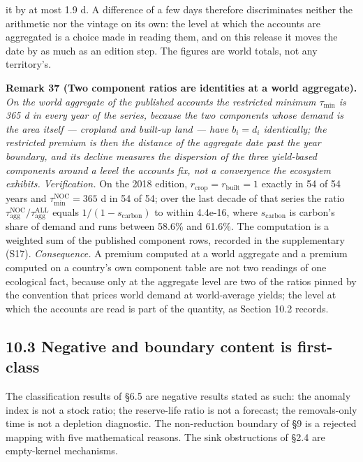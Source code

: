 \documentclass[11pt]{article}
\begin{document}
it by at most 1.9 d. A difference of a few days therefore discriminates neither the arithmetic nor the vintage on its own: the level at which the accounts are aggregated is a choice made in reading them, and on this release it moves the date by as much as an edition step. The figures are world totals, not any territory's.

\textbf{Remark 37 (Two component ratios are identities at a world aggregate).} \emph{On the world aggregate of the published accounts the restricted minimum \(\tau_{\min}\) is 365 d in every year of the series, because the two components whose demand is the area itself --- cropland and built-up land --- have \(b_i = d_i\) identically; the restricted premium is then the distance of the aggregate date past the year boundary, and its decline measures the dispersion of the three yield-based components around a level the accounts fix, not a convergence the ecosystem exhibits.} \emph{Verification.} On the 2018 edition, \(r_{\mathrm{crop}} =\allowbreak{} r_{\mathrm{built}} =\allowbreak{} 1\) exactly in 54 of 54 years and \(\tau_{\min}^{\mathrm{NOC}} =\allowbreak{} 365\) d in 54 of 54; over the last decade of that series the ratio \(\tau_{\mathrm{agg}}^{\mathrm{NOC}}/\tau_{\mathrm{agg}}^{\mathrm{ALL}}\) equals \(1/(1-s_{\mathrm{carbon}})\) to within 4.4e-16, where \(s_{\mathrm{carbon}}\) is carbon's share of demand and runs between 58.6\% and 61.6\%. The computation is a weighted sum of the published component rows, recorded in the supplementary (S17). \emph{Consequence.} A premium computed at a world aggregate and a premium computed on a country's own component table are not two readings of one ecological fact, because only at the aggregate level are two of the ratios pinned by the convention that prices world demand at world-average yields; the level at which the accounts are read is part of the quantity, as Section 10.2 records.

\subsection*{10.3 Negative and boundary content is first-class}\label{103-negative-and-boundary-content-is-first-class}

The classification results of \S6.5 are negative results stated as such: the anomaly index is not a stock ratio; the reserve-life ratio is not a forecast; the removals-only time is not a depletion diagnostic. The non-reduction boundary of \S9 is a rejected mapping with five mathematical reasons. The sink obstructions of \S2.4 are empty-kernel mechanisms.
\end{document}
